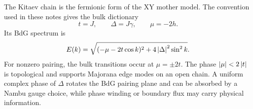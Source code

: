 The Kitaev chain is the fermionic form of the XY mother model.  The convention
used in these notes gives the bulk dictionary
\begin{equation}
    t=J,
    \qquad
    \Delta=J\gamma,
    \qquad
    \mu=-2h.
\end{equation}
Its BdG spectrum is
\begin{equation}
    E(k)=\sqrt{(-\mu-2t\cos k)^2+4\left|\Delta\right|^2\sin^2 k}.
\end{equation}
For nonzero pairing, the bulk transitions occur at $\mu=\pm2t$.  The phase
$\left|\mu\right|<2\left|t\right|$ is topological and supports Majorana edge modes on an open
chain.  A uniform complex phase of $\Delta$ rotates the BdG pairing plane and can
be absorbed by a Nambu gauge choice, while phase winding or boundary flux may
carry physical information.
